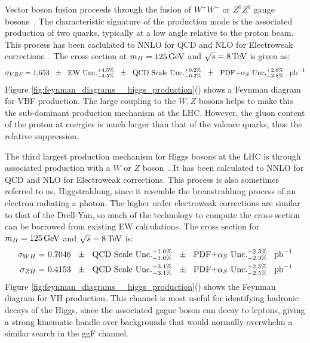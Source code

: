 \par Vector boson fusion proceeds through the fusion of $W^{+}W^{-}$
or $Z^{0}Z^{0}$  gauge bosons~\cite{th:HiggsXS_2013}. The
characteristic signature of the production mode is the associated
production of two quarks, typically at a low angle relative to the
proton beam.  This process has been caclulated to NNLO for QCD and NLO
for Electroweak corrections~\cite{th:HiggsXS_2013}.  The cross section
at $m_{H} = 125\,\text{Ge\hspace{-.08em}V}$ and $\sqrt{s}=8\,\text{Te\hspace{-.08em}V}$ is given as:
\begin{equation}\label{eq:vbf_xs}
\sigma_{VBF} = 1.653~~\pm \text{~~EW Unc.}^{+4.5\%}_{-4.5\%}~~\pm
\text{~~QCD Scale Unc.}^{+0.2\%}_{-0.2\%}~~\pm
\text{~~PDF+$\alpha_{S}$ Unc.}^{+2.6\%}_{-2.8\%}~~\mbox{\ensuremath{\,\text{pb}^\text{$-$1}}} 
\end{equation}
\noindent Figure
\ref{fig:feynman_diagrams__higgs_production}()
shows a Feynman diagram for VBF production.  The large coupling to the
$W,Z$ bosons helps to make this the sub-dominant production mechanism
at the LHC.  However, the gluon content of the proton at \TeV energies
is much larger than that of the valence quarks, thus the relative
suppression.  

\par The third largest production mechanism for Higgs bosons at the
LHC is through associated production with a $W$ or $Z$
boson~\cite{th:HiggsXS_2013}.  It has been calculated to NNLO for QCD
and NLO for Electroweak corrections. This process is also sometimes
referred to as, Higgstrahlung, since it resemble the bremstrahlung
process of an electron radiating a photon. The higher order
electroweak corrections are similar to that of the Drell-Yan, so much
of the technology to compute the cross-section can be borrowed from
existing EW calculations.  The cross section for $m_{H} = 125\,\text{Ge\hspace{-.08em}V}$ and
$\sqrt{s}=8\,\text{Te\hspace{-.08em}V}$ is:  
\begin{equation}\label{eq:vh_xs}
\begin{aligned}
\sigma_{WH} =&~ 0.7046~~\pm \text{~~QCD Scale Unc.}^{+1.0\%}_{-1.0\%}~~\pm
\text{~~PDF+$\alpha_{S}$ Unc.}^{+2.3\%}_{-2.3\%}~~\mbox{\ensuremath{\,\text{pb}^\text{$-$1}}} \\
\sigma_{ZH} =&~ 0.4153~~\pm \text{~~QCD Scale Unc.}^{+3.1\%}_{-3.1\%}~~\pm
\text{~~PDF+$\alpha_{S}$ Unc.}^{+2.5\%}_{-2.5\%}~~\mbox{\ensuremath{\,\text{pb}^\text{$-$1}}} 
\end{aligned}
\end{equation}
\noindent Figure
\ref{fig:feynman_diagrams__higgs_production}()
shows the Feynman diagram for VH production.  This channel is most
useful for identifying hadronic decays of the Higgs, since the
associated gague boson can decay to leptons, giving a strong kinematic
handle over backgrounds that would normally overwhelm a similar search
in the ggF channel.  


